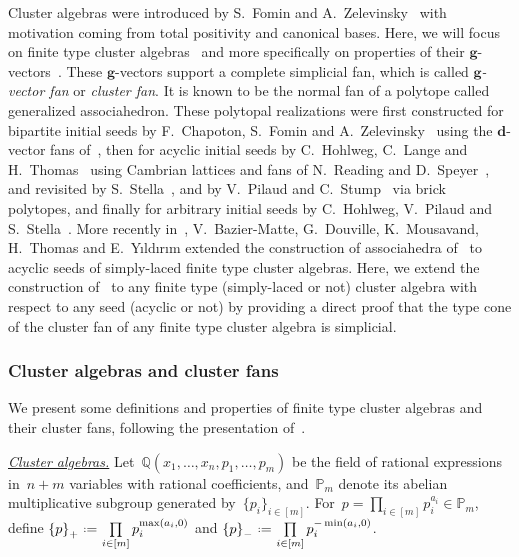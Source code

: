 \documentclass{amsart}
\theoremstyle{definition}
\newcommand{\Q}{\mathbb{Q}} %
\renewcommand{\b}[1]{{\boldsymbol{#1}}} %
\newcommand{\eqdef}{\mbox{\,\raisebox{0.2ex}{\scriptsize\ensuremath{\mathrm:}}\ensuremath{=}\,}} %
\newcommand{\darkblue}{\color{darkblue}} %
\newcommand{\defn}[1]{\textsl{\darkblue #1}} %
\newcommand{\para}[1]{\medskip\noindent\uline{\textit{#1.}}} %
\newcommand{\Trop}[1]{\mathbb{P}_{#1}} %
\newcommand{\positiveExponents}[1]{\left\{#1\right\}_+} %
\newcommand{\negativeExponents}[1]{\left\{#1\right\}_-} %
\begin{document}
Cluster algebras were introduced by S.~Fomin and A.~Zelevinsky~\cite{FominZelevinsky-ClusterAlgebrasI} with motivation coming from total positivity and canonical bases.
Here, we will focus on finite type cluster algebras~\cite{FominZelevinsky-ClusterAlgebrasII} and more specifically on properties of their $\b{g}$-vectors~\cite{FominZelevinsky-ClusterAlgebrasIV}.
These $\b{g}$-vectors support a complete simplicial fan, which is called \defn{$\b{g}$-vector fan} or \defn{cluster fan}. It is known to be the normal fan of a polytope called generalized associahedron. These polytopal realizations were first constructed for bipartite initial seeds by F.~Chapoton, S.~Fomin and A.~Zelevinsky~\cite{ChapotonFominZelevinsky} using the $\b{d}$-vector fans of~\cite{FominZelevinsky-YSystems}, then for acyclic initial seeds by C.~Hohlweg, C.~Lange and H.~Thomas~\cite{HohlwegLangeThomas} using Cambrian lattices and fans of N.~Reading and D.~Speyer~\cite{Reading-CambrianLattices, ReadingSpeyer}, and revisited by S.~Stella~\cite{Stella}, and by V.~Pilaud and C.~Stump~\cite{PilaudStump-brickPolytope} via brick polytopes, and finally for arbitrary initial seeds by C.~Hohlweg, V.~Pilaud and S.~Stella~\cite{HohlwegPilaudStella}.
More recently in~\cite{BazierMatteDouvilleMousavandThomasYildirim}, V.~Bazier-Matte, G.~Douville, K.~Mousavand, H.~Thomas and E.~Y\i ld\i r\i m extended the construction of associahedra of~\cite[Sect.~3.2]{ArkaniHamedBaiHeYan} to acyclic seeds of simply-laced finite type cluster algebras.
Here, we extend the construction of~\cite[Sect.~3.2]{ArkaniHamedBaiHeYan} to any finite type (simply-laced or not) cluster algebra with respect to any seed (acyclic or not) by providing a direct proof that the type cone of the cluster fan of any finite type cluster algebra is simplicial.


\subsubsection{Cluster algebras and cluster fans}

We present some definitions and properties of finite type cluster algebras and their cluster fans, following the presentation of~\cite{HohlwegPilaudStella}.

\para{Cluster algebras}
%
Let~$\Q(x_1, \dots, x_n, p_1, \dots, p_m)$ be the field of rational expressions in~$n+m$ variables with rational coefficients, and~$\Trop{m}$ denote its abelian multiplicative subgroup generated by~$\{p_i\}_{i \in [m]}$.
For~$p = \prod\limits_{i \in [m]} p_i^{a_i} \in \Trop{m}$, define
\(
\positiveExponents{p} \eqdef \prod\limits_{i \in [m]} p_i^{\max(a_i,0)}
\)
and
\(
\negativeExponents{p} \eqdef \prod\limits_{i \in [m]} p_i^{-\min(a_i,0)}
\).
\end{document}
